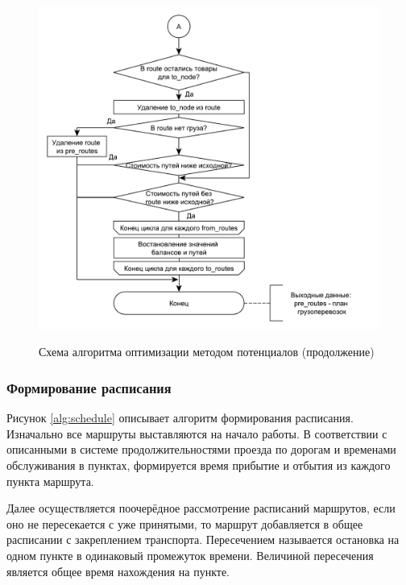 \begin{figure}[h]
	\begin{center}
		{\includegraphics[scale=0.7, angle=0, page=1]{img/potential_optimize_2.pdf}}
		\caption{Схема алгоритма оптимизации методом потенциалов (продолжение)}
		\label{alg:potential_2}
	\end{center}
\end{figure}

\subsubsection{Формирование расписания}
Рисунок \ref{alg:schedule} описывает алгоритм формирования расписания. Изначально все маршруты выставляются на начало работы. В соответствии с описанными в системе продолжительностями проезда по дорогам и временами обслуживания в пунктах, формируется время прибытие и отбытия из каждого пункта маршрута. 

Далее осуществляется поочерёдное рассмотрение расписаний маршрутов, если оно не пересекается с уже принятыми, то маршрут добавляется в общее расписании с закреплением транспорта. Пересечением называется остановка на одном пункте в одинаковый промежуток времени. Величиной пересечения является общее время нахождения на пункте.

